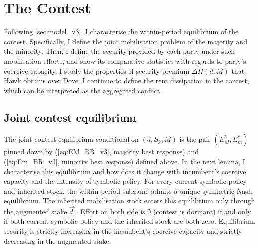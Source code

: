 \documentclass[11pt,twoside]{extarticle}
\begin{document}

\section{The Contest}\label{sec:block1}

Following \autoref{sec:model_v3}, I characterise the witnin-period equilibrium of the contest. Specifically, I define the joint mobilisation problem of the majority and the minority. Then, I define the security provided by each party under such mobilisation efforts, and show its comparative statistics with regards to party's coercive capacity. I study the properties of security premium $\Delta\Pi(d;M)$ that Hawk obtains over Dove. I continue to define the rent dissipation in the contest, which can be interpreted as the aggregated conflict.


\subsection{Joint contest equilibrium}\label{subsec:contest_eqm_v3}

The joint contest equilibrium conditional on $(d,S_k,M)$ is the pair $(E_M^*,E_m^*)$ pinned down by (\ref{eq:EM_BR_v3}, majority best response) and (\ref{eq:Em_BR_v3}, minoirty best response) defined above. 
In the next lemma, I characterise this equilibrium and how does it change with incumbent's coercive capacity and the intensity of symbolic policy. 
For every current symbolic policy and inherited stock, the within-period subgame admits a unique symmetric Nash equilibrium.
The inherited mobilisation stock enters this equilibrium only through the augmented stake $\hat d^\sigma$. 
Effort on both side is 0 (contest is dormant) if and only if both current symbolic policy and the inherited stock are both zero.
Equilibrium security is strictly increasing in the incumbent's coercive capacity and strictly decreasing in the augmented stake.
\end{document}
